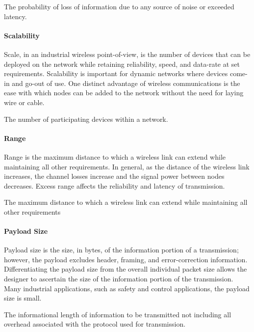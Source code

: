 \begin{definition}[Reliability] \label{def:reliability}
	The probability of loss of information due to any source of noise or exceeded latency.
\end{definition}

\paragraph{Scalability}
Scale, in an industrial wireless point-of-view, is the number of devices that can be deployed on the network while retaining reliability, speed, and data-rate at set requirements. Scalability is important for dynamic networks where devices come-in and go-out of use. One distinct advantage of wireless communications is the ease with which nodes can be added to the network without the need for laying wire or cable.
\begin{definition}[Scale] \label{def:scale}
	The number of participating devices within a network.
\end{definition}

\paragraph{Range}
Range is the maximum distance to which a wireless link can extend while maintaining all other requirements. In general, as the distance of the wireless link increases, the channel losses increase and the signal power between nodes decreases. Excess range affects the reliability and latency of transmission.
\begin{definition}[Range] \label{def:range}
	The maximum distance to which a wireless link can extend while maintaining all other requirements
\end{definition}

\paragraph{Payload Size}
Payload size is the size, in bytes, of the information portion of a transmission; however, the payload excludes header, framing, and error-correction information. Differentiating the payload size from the overall individual packet size allows the designer to ascertain the size of the information portion of the transmission. Many industrial applications, such as safety and control applications, the payload size is small.
\begin{definition} \label{def:payloadsize}
	The informational length of information to be transmitted not including all overhead associated with the protocol used for transmission.
\end{definition}

